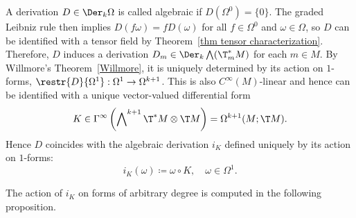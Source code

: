 \begin{defn}
    A derivation $D\in\Der_k\Omega$ is called algebraic if $D(\Omega^0)=\{0\}$. The graded Leibniz rule then implies $D(f\omega)=fD(\omega)$ for all $f\in \Omega^0$ and $\omega\in \Omega$, so $D$ can be identified with a tensor field by Theorem~\ref{thm tensor characterization}. Therefore, $D$ induces a derivation $D_m\in \Der_k \bigwedge (\T^\ast_m M)$ for each $m\in M$. By Willmore's Theorem~\ref{Willmore}, it is uniquely determined by its action on $1$-forms, $\restr{D}{\Omega^1}:\Omega^1\to \Omega^{k+1}$. This is also $C^\infty(M)$-linear and hence can be identified with a unique vector-valued differential form 
    \[K\in \Gamma^\infty\left(\bigwedge\nolimits^{k+1}\T^\ast M\otimes \T M\right)=\Omega^{k+1}(M;\T M).\]
    Hence $D$ coincides with the algebraic derivation $i_K$ defined uniquely by its action on $1$-forms:
    \[i_K(\omega)\coloneqq \omega\circ K,\quad \omega\in\Omega^1.\]
\end{defn}

The action of $i_K$ on forms of arbitrary degree is computed in the following proposition.

